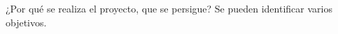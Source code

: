 \clearpage
{}


¿Por qué se realiza el proyecto, que se persigue? Se pueden identificar varios objetivos.
